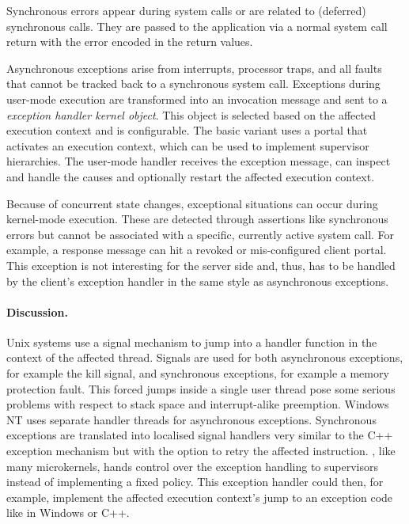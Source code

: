 Synchronous errors appear during system calls or are related to (deferred) synchronous calls. They are passed to the application via a normal system call return with the error encoded in the return values.

Asynchronous exceptions arise from interrupts, processor traps, and all faults that cannot be tracked back to a synchronous system call. Exceptions during user-mode execution are transformed into an invocation message and sent to a \emph{exception handler kernel object}. This object is selected based on the affected execution context and is configurable. The basic variant uses a portal that activates an execution context, which can be used to implement supervisor hierarchies. The user-mode handler receives the exception message, can inspect and handle the causes and optionally restart the affected execution context.

Because of concurrent state changes, exceptional situations can occur during kernel-mode execution. These are detected through assertions like synchronous errors but cannot be associated with a specific, currently active system call. For example, a response message can hit a revoked or mis-configured client portal. This exception is not interesting for the server side and, thus, has to be handled by the client's exception handler in the same style as asynchronous exceptions.

\paragraph{Discussion.}
Unix systems use a signal mechanism to jump into a handler function in the context of the affected thread. Signals are used for both asynchronous exceptions, for example the kill signal, and synchronous exceptions, for example a memory protection fault. This forced jumps inside a single user thread pose some serious problems with respect to stack space and interrupt-alike preemption. 
Windows NT uses separate handler threads for asynchronous exceptions. Synchronous exceptions are translated into localised signal handlers very similar to the C++ exception mechanism but with the option to retry the affected instruction.
\mythos, like many microkernels, hands control over the exception handling to supervisors instead of implementing a fixed policy. This exception handler could then, for example, implement the affected execution context's jump to an exception code like in Windows or C++.


